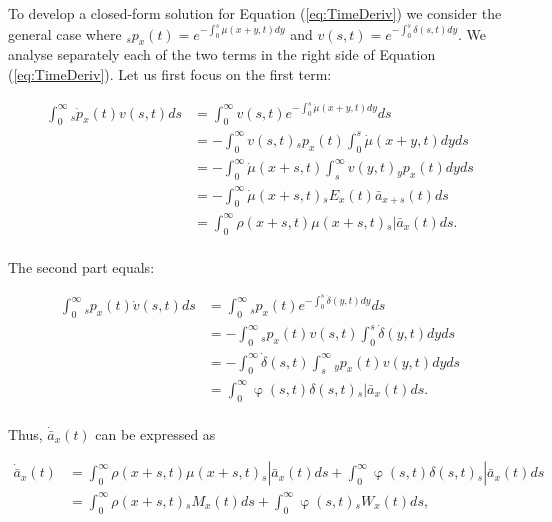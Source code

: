 \documentclass[12pt]{article}
\begin{document}
To develop a closed-form solution for Equation (\ref{eq:TimeDeriv}) we consider the general case where $_sp_x(t)=e^{-\int_{0}^{s}\mu(x+y,t)dy}$ and ${v}(s,t)=e^{-\int_{0}^{s}\delta(s,t)dy}$. We analyse separately each of the two terms in the right side of Equation (\ref{eq:TimeDeriv}). Let us first focus on the first term:


\begin{equation}\label{eq:TimeDerivP1}
\begin{split}
\int_0^\infty {}_s\dot{p}_x(t) v(s,t)ds &= \int_0^\infty   v(s,t) e^{-\int_0^{s}\dot{\mu}(x+y,t)dy}ds\\
&= -\int_0^\infty   v(s,t) {}_sp_x(t)\int_0^{s}\dot{\mu}(x+y,t)dyds\\
&= -\int_0^\infty  \dot{\mu}(x+s,t) \int_s^{\infty} v(y,t) {}_yp_x(t) dyds\\
&= - \int_0^\infty \dot{\mu}(x+s,t)   {}_sE_x(t) \bar{a} _{x+s}(t) ds\\
&= \int_0^\infty \rho(x+s,t) \mu(x+s,t)   {}_s|\bar{a}_x(t) ds.\\
\end{split}
\end{equation}


The second part equals:

\begin{equation}\label{eq:TimeDerivP2}
\begin{split}
\int_0^\infty {}_sp_x(t) \dot{v}(s,t)ds &= \int_0^\infty {}_sp_x(t)  e^{-\int_0^{s}\dot{\delta}(y,t)dy}ds\\
&= -\int_0^\infty {}_sp_x(t) v(s,t) \int_0^{s}\dot{\delta}(y,t)dy ds\\
&= -\int_0^\infty  \dot{\delta}(s,t)\int_s^{\infty} {}_yp_x(t) v(y,t) dy ds\\
&= \int_0^\infty  \upvarphi(s,t) \delta(s,t)  {}_s|\bar{a}_x(t) ds.\\
\end{split}
\end{equation}


Thus, $\dot{\bar{a}} _x(t)$ can be expressed as


\begin{equation}\label{eq:TimeDerivP3}
\begin{split}
\dot{\bar{a}}_{x}(t) &=  \int_0^\infty \rho(x+s,t) \mu(x+s,t){}_s|\bar{a}_x(t) ds +\int_0^\infty  \upvarphi(s,t) \delta(s,t)  {}_s|\bar{a}_x(t) ds\\
&= \int_0^\infty \rho(x+s,t) {}_sM_x(t)  ds +\int_0^\infty  \upvarphi(s,t) {}_sW_x(t)  ds,
\end{split}
\end{equation}
\end{document}
